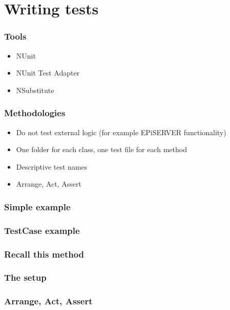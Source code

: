 \documentclass{beamer}
\begin{document}
	\section{Writing tests}
		\begin{frame}
			\frametitle{Tools} \pause
			\begin{itemize}
				\item NUnit \pause
				\item NUnit Test Adapter \pause
				\item NSubstitute
			\end{itemize}
		\end{frame}
		\begin{frame}
			\frametitle{Methodologies} \pause
			\begin{itemize}
				\item Do not test external logic (for example EPiSERVER functionality)\pause
				\item One folder for each class, one test file for each method \pause
				\item Descriptive test names \pause
				\item Arrange, Act, Assert 
			\end{itemize}
		\end{frame}
		\begin{frame}
			\frametitle{Simple example}
			
		\end{frame}
		\begin{frame}
			\frametitle{TestCase example}
			
		\end{frame}
		\begin{frame}
			\frametitle{Recall this method}
			
		\end{frame}

		\begin{frame}
			\frametitle{The setup}
			
		\end{frame}

		\begin{frame}
			\frametitle{Arrange, Act, Assert}
			
		\end{frame}
\end{document}
